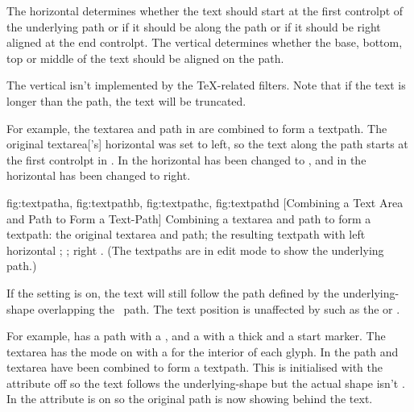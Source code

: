 The horizontal  determines
whether the text should start at the first \gls{controlpt} of the
underlying path or if it should be  along the path or if
it should be right aligned at the end \gls*{controlpt}. The vertical
 determines whether the base, bottom, top or middle of the
text should be aligned on the path. 

\begin{important}
The vertical  isn't implemented by the
 \TeX-related filters. Note that if the text is
longer than the path, the text will be truncated.
\end{important}

For example, the \gls{textarea} and \gls{path} in
 are combined to form a \gls*{textpath}.
The original \gls*{textarea}['s] horizontal  was
set to left, so the text along the path starts at the first
\gls{controlpt} in . In
 the horizontal  has been
changed to , and in  the
horizontal  has been changed to right.

{
 {fig:textpatha}{}{},
 {fig:textpathb}{}{},
 {fig:textpathc}{}{},
 {fig:textpathd}{}{}
}
[Combining a Text Area and Path to Form a Text-Path]
{Combining a \gls{textarea} and \gls{path} to form a \gls{textpath}:
 the original \gls{textarea} and \gls{path};
 the resulting \gls{textpath} with left horizontal 
; 
  ; 
 right . 
(The \glspl{textpath} are in edit mode to show the underlying path.)}

If the  setting is on, the text will still
follow the path defined by the \gls{underlying-shape} overlapping
the \rendered\ path. The text position is unaffected by
 such as the  or
.

For example, 
has a path with a , 
and a  with a thick  and a start marker.
The \gls{textarea} has the  mode on with a 
 for the interior of each glyph.
In  the \gls{path} and \gls{textarea}
have been combined to form a \gls{textpath}. This is initialised
with the  attribute off so the text follows
the \gls{underlying-shape} but the actual shape isn't \rendered.
In  the 
attribute is on so the original path is now showing behind the text.

